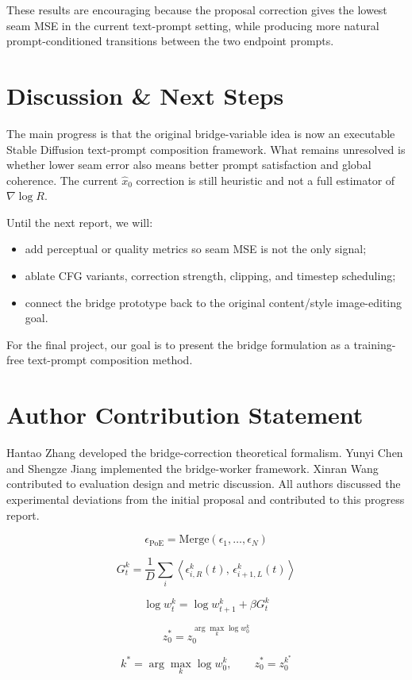 \documentclass[10pt,conference,compsocconf]{IEEEtran}
\begin{document}
These results are encouraging because the proposal correction gives the lowest seam MSE in the current text-prompt setting, while producing more natural prompt-conditioned transitions between the two endpoint prompts.

\section{Discussion \& Next Steps}

The main progress is that the original bridge-variable idea is now an executable Stable Diffusion text-prompt composition framework.
What remains unresolved is whether lower seam error also means better prompt satisfaction and global coherence.
The current $\hat{x}_0$ correction is still heuristic and not a full estimator of $\nabla\log R$.

Until the next report, we will:
\begin{itemize}
\item add perceptual or quality metrics so seam MSE is not the only signal;
\item ablate CFG variants, correction strength, clipping, and timestep scheduling;
\item connect the bridge prototype back to the original content/style image-editing goal.
\end{itemize}

For the final project, our goal is to present the bridge formulation as a training-free text-prompt composition method.

\section{Author Contribution Statement}

Hantao Zhang developed the bridge-correction theoretical formalism.
Yunyi Chen and Shengze Jiang implemented the bridge-worker framework.
Xinran Wang contributed to evaluation design and metric discussion.
All authors discussed the experimental deviations from the initial proposal and contributed to this progress report.

\[
\epsilon_{\mathrm{PoE}}=\mathrm{Merge}(\epsilon_1,\ldots,\epsilon_N)
\]

\[
G_t^k=\frac{1}{D}\sum_i \left\langle \epsilon_{i,R}^{k}(t),\,\epsilon_{i+1,L}^{k}(t)\right\rangle
\]

\[
\log w_t^k=\log w_{t+1}^k+\beta G_t^k
\]

\[
z_0^{*}=z_0^{\arg\max_k \log w_0^k}
\]

\[
k^{*}=\arg\max_k \log w_0^k,\qquad z_0^{*}=z_0^{k^{*}}
\]



\end{document}
